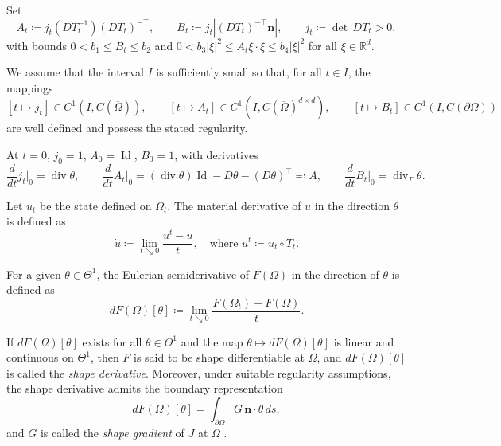 \documentclass[a4paper,11pt]{article}
\newcommand{\vect}[1]{\boldsymbol{\mathbf{#1}}}
\newcommand{\dive}{\operatorname{div}}
\newcommand{\Id}{\operatorname{Id}}
\newcommand{\intervalI}{I}
\newcommand{\Jact}{j_{t}}
\newcommand{\sfTheta}{\Theta}
\newcommand{\sfj}{F}
\newcommand{\VV}{\theta}
\newcommand{\nn}{\vect{n}}
\begin{document}
Set
\[
A_t \coloneqq {\Jact} ({D}T_t^{-1})({D}T_t)^{-\top}, \qquad 
B_t \coloneqq {\Jact} |({D}T_t)^{-\top} \nn|, \qquad {\Jact} \coloneqq \det \,{D}T_t > 0,
\]
with bounds $0<{b}_1 \leqslant B_t \leqslant {b}_2$ and $0<{b}_3 |\xi|^2 \leqslant A_t \xi \cdot \xi \leqslant {b}_4 |\xi|^2$ for all $\xi \in \mathbb{R}^d$.

We assume that the interval $\intervalI$ is sufficiently small so that, for all $t \in \intervalI$, the mappings
\begin{equation}\label{eq:continuity_of_the_maps}
[t \mapsto {\Jact}] \in {C}^1(\intervalI,{C}(\overline{\varOmega})), \qquad
[t \mapsto A_t] \in {C}^1(\intervalI,{C}(\overline{\varOmega})^{d\times d}),\qquad
[t \mapsto B_t] \in {C}^1(\intervalI,{C}(\partial{\varOmega}))
\end{equation}
are well defined and possess the stated regularity.

At $t=0$, $j_0 = 1$, $A_0 = \Id$, $B_0 = 1$, with derivatives
\begin{equation}\label{eq:derivatives}
\frac{d}{dt} {\Jact} \big|_{0} = \dive \VV, \qquad 
\frac{d}{dt} A_t \big|_{0} = (\dive \VV)\Id - D\VV - (D\VV)^\top \eqqcolon A, \qquad
\frac{d}{dt} B_t \big|_{0} = \dive_\varGamma \VV.
\end{equation}
%

Let $u_t$ be the state defined on $\varOmega_t$. 
The material derivative of $u$ in the direction $\VV$ is defined as
\[
\dot{u} \coloneqq \lim_{t\searrow 0} \frac{u^t - u}{t},
\quad \text{where } u^t \coloneqq u_t \circ T_t.
\]

For a given $\VV \in \sfTheta^{1}$, the Eulerian semiderivative of $\sfj(\varOmega)$ in the direction of $\VV$ is defined as
\[
d\sfj(\varOmega)[\VV] \coloneqq \lim_{t\searrow0} \frac{\sfj(\varOmega_t) - \sfj(\varOmega)}{t}.
\]

If $d\sfj(\varOmega)[\VV]$ exists for all $\VV \in \sfTheta^{1}$ and the map $\VV \mapsto d\sfj(\varOmega)[\VV]$ is linear and continuous on $\sfTheta^{1}$, then $\sfj$ is said to be shape differentiable at $\varOmega$, and $d\sfj(\varOmega)[\VV]$ is called the \textit{shape derivative}.
%
Moreover, under suitable regularity assumptions, the shape derivative admits the boundary representation
\[
d\sfj(\varOmega)[\VV] = \int_{\partial \varOmega} G \, \nn \cdot \VV\, ds,
\]
and $G$ is called the \textit{shape gradient} of $J$ at $\varOmega$ \cite[Def.~3.4, p.~479]{DelfourZolesio2011}.
\end{document}
